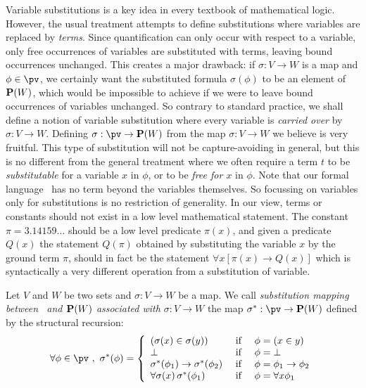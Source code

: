 Variable substitutions is a key idea in every textbook of
mathematical logic. However, the usual treatment attempts to define
substitutions where variables are replaced by {\em terms}. Since
quantification can only occur with respect to a variable, only free
occurrences of variables are substituted with terms, leaving bound
occurrences unchanged. This creates a major drawback: if
$\sigma:V\to W$ is a map and $\phi\in\pv$, we certainly want the
substituted formula $\sigma(\phi)$ to be an element of ${\bf P}(W)$,
which would be impossible to achieve if we were to leave bound
occurrences of variables unchanged. So contrary to standard
practice, we shall define a notion of variable substitution where
every variable is {\em carried over} by $\sigma:V\to W$. Defining
$\sigma:\pv\to{\bf P}(W)$ from the map $\sigma:V\to W$ we believe is
very fruitful. This type of substitution will not be
capture-avoiding in general, but this is no different from the
general treatment where we often require a term $t$ to be {\em
substitutable} for a variable $x$ in $\phi$, or to be {\em free for
$x$} in $\phi$. Note that our formal language \pv\ has no term
beyond the variables themselves. So focussing on variables only for
substitutions is no restriction of generality. In our view, terms or
constants should not exist in a low level mathematical statement.
The constant $\pi=3.14159\ldots$ should be a low level predicate
$\pi(x)$, and given a predicate $Q(x)$ the statement $Q(\pi)$
obtained by substituting the variable $x$ by the ground term $\pi$,
should in fact be the statement $\forall x[\pi(x)\to Q(x)]$ which is
syntactically a very different operation from a substitution of
variable. 
\begin{defin}\label{logic:def:substitution}
    Let $V$ and $W$ be two sets and $\sigma:V\to W$ be a map. We call
    {\em substitution mapping between \pv\ and ${\bf P}(W)$ associated
    with $\sigma:V\to W$} the map $\sigma^{*}:\pv\to{\bf P}(W)$ defined
    by the structural recursion:
    \begin{equation}\label{logic:eqn:substitution:recursion}
        \forall\phi\in\pv\ ,\ \sigma^{*}(\phi)=\left\{
            \begin{array}{lcl}
                (\sigma(x)\in\sigma(y))
                    &\mbox{\ if\ }&
                \phi=(x\in y)
                \\
                \bot
                    &\mbox{\ if\ }&
                \phi=\bot
                \\
                \sigma^{*}(\phi_{1})\to \sigma^{*}(\phi_{2}) 
                    &\mbox{\ if\ }&
                \phi=\phi_{1}\to\phi_{2}
                \\
                \forall\sigma(x)\,\sigma^{*}(\phi_{1})
                    &\mbox{\ if\ }&
                \phi=\forall x\phi_{1}
            \end{array}\right.
    \end{equation}
\end{defin}
